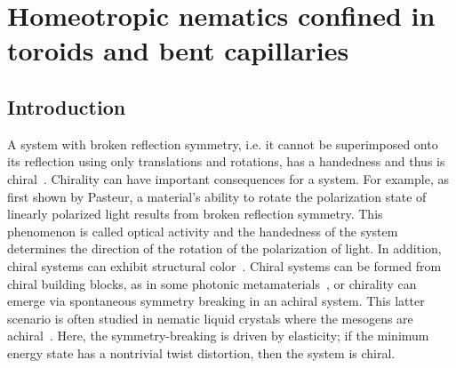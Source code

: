 \chapter{Homeotropic nematics confined in toroids and bent capillaries}

\section{Introduction}
A system with broken reflection symmetry, i.e. it cannot be superimposed onto its reflection using only translations and rotations, has a handedness and thus is chiral~\cite{RN175}.
Chirality can have important consequences for a system.
For example, as first shown by Pasteur, a material's ability to rotate the polarization state of linearly polarized light results from broken reflection symmetry.
This phenomenon is called optical activity and the handedness of the system determines the direction of the rotation of the polarization of light\cite{RN291}.
In addition, chiral systems can exhibit structural color~\cite{RN308,RN307}.
Chiral systems can be formed from chiral building blocks, as in some photonic metamaterials~\cite{RN304}, or chirality can emerge via spontaneous symmetry breaking in an achiral system\cite{RN294}.
This latter scenario is often studied in nematic liquid crystals where the mesogens are achiral~\cite{RN297,RN296,RN298,RN295,RN299,RN193,RN46,RN192,RN191,RN293,RN302}.
Here, the symmetry-breaking is driven by elasticity; if the minimum energy state has a nontrivial twist distortion, then the system is chiral.


